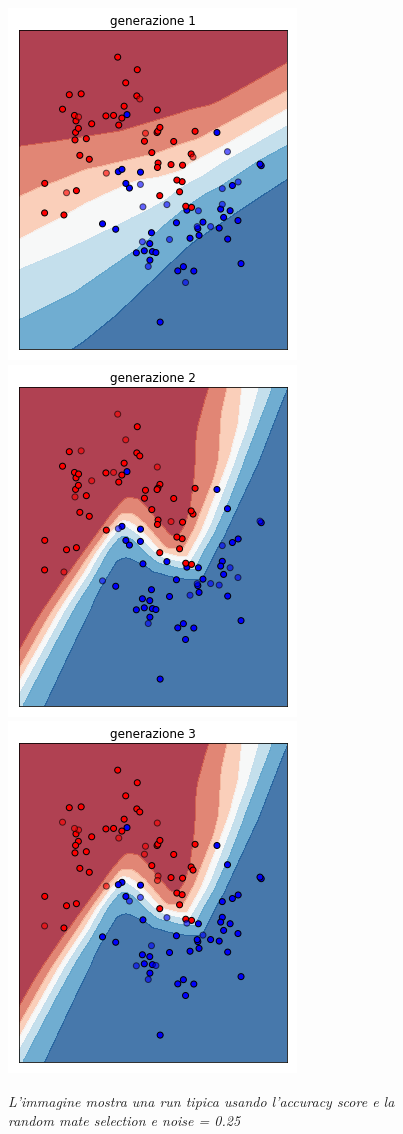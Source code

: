 \documentclass[12pt,a4paper]{report}
\begin{document}
\begin{figure}[H]
 \centering
 \includegraphics[scale = 0.5]{images/moons-rnd-acc./1}
 \includegraphics[scale = 0.5]{images/moons-rnd-acc./2}
 \includegraphics[scale = 0.5]{images/moons-rnd-acc./3}
 \caption{\textit{L'immagine mostra una run tipica usando l'accuracy score e la random mate selection e noise = 0.25}}
 \label{moons1}
\end{figure}
\end{document}
